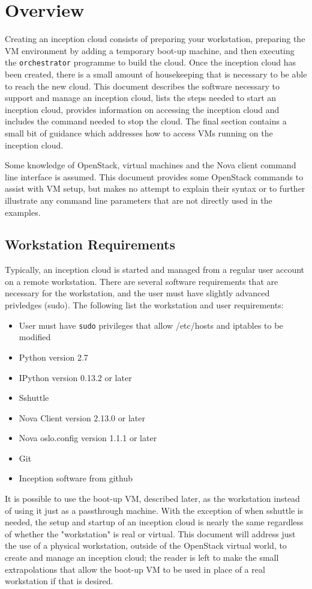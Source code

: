 \section{Overview}
Creating an inception cloud consists of preparing your workstation, preparing the VM environment by adding a temporary boot-up machine, 
and then executing the \verb!orchestrator! programme to build the cloud.  
Once the inception cloud has been created, there is a small amount of housekeeping that is necessary to be able to reach the new cloud. 
This document describes the software necessary to support and manage an inception cloud, lists the steps needed to start an 
inception cloud, provides information on accessing the inception cloud and includes the command needed to stop the cloud. 
The final section contains a small bit of guidance which addresses how to access VMs running on the inception cloud.

Some knowledge of OpenStack, virtual machines and the Nova client command line interface is assumed. 
This document provides some OpenStack commands to assist with VM setup, but makes no attempt to explain 
their syntax or to further illustrate any command line parameters that are not directly used in the examples. 

\subsection{Workstation Requirements }
Typically, an inception cloud is started and managed from a regular user account on a remote workstation. 
There are several software requirements that are necessary for the workstation, and the user must have slightly 
advanced privledges (sudo).
The following list the workstation and user requirements:

\begin{itemize}
\item User must have \verb!sudo! privileges that allow /etc/hosts and iptables to be modified
\item Python version 2.7
\item IPython version 0.13.2 or later
\item Sshuttle 
\item Nova Client version 2.13.0 or later
\item Nova oslo.config version 1.1.1 or later
\item Git 
\item Inception software from github
\end{itemize}

\noindent
It is possible to use the boot-up VM, described later,  as the workstation instead of using it just as a passthrough machine.  
With the exception of when sshuttle is needed, the setup and startup of an inception cloud is nearly the 
same regardless of whether the "workstation" is real or virtual. 
This document will address just the use of a physical workstation, 
outside of the OpenStack virtual world, to create and manage an inception cloud; the reader is left to make the 
small extrapolations that allow the boot-up VM to be used in place of a real workstation if that is desired.

